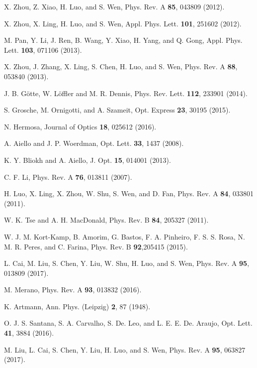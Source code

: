 \documentclass[twocolumn,showpacs,preprintnumbers,amsmath,amssymb]{revtex4}
\begin{document}
\begin{references}
 X. Zhou, Z. Xiao, H. Luo, and S. Wen, Phys. Rev. A \textbf{85}, 043809 (2012).

 X. Zhou, X. Ling, H. Luo, and S. Wen, Appl. Phys. Lett. \textbf{101}, 251602 (2012).

 M. Pan, Y. Li, J. Ren, B. Wang, Y. Xiao, H. Yang, and Q. Gong, Appl. Phys. Lett. \textbf{103}, 071106 (2013).

 X. Zhou, J. Zhang, X. Ling, S. Chen, H. Luo, and S. Wen, Phys. Rev. A \textbf{88}, 053840 (2013).

 J. B. G\"{o}tte, W. L\"{o}ffler and M. R. Dennis, Phys. Rev. Lett. \textbf{112}, 233901 (2014).

 S. Grosche, M. Ornigotti, and A. Szameit, Opt. Express \textbf{23}, 30195 (2015).

 N. Hermosa, Journal of Optics \textbf{18}, 025612 (2016).

 A. Aiello and J. P. Woerdman, Opt. Lett. \textbf{33}, 1437 (2008).

 K. Y. Bliokh and A. Aiello, J. Opt. \textbf{15}, 014001 (2013).

 C. F. Li, Phys. Rev. A \textbf{76}, 013811 (2007).

 H. Luo, X. Ling, X. Zhou, W. Shu, S. Wen, and D. Fan, Phys. Rev. A \textbf{84}, 033801 (2011).

 W. K. Tse and A. H. MacDonald, Phys. Rev. B \textbf{84}, 205327 (2011).

 W. J. M. Kort-Kamp, B. Amorim, G. Bastos, F. A. Pinheiro, F. S. S. Rosa, N. M. R. Peres, and C. Farina, Phys. Rev. B \textbf{92},205415 (2015).

 L. Cai, M. Liu, S. Chen, Y. Liu, W. Shu, H. Luo, and S. Wen, Phys. Rev. A \textbf{95}, 013809 (2017).

 M. Merano, Phys. Rev. A \textbf{93}, 013832 (2016).

 K. Artmann, Ann. Phys. (Leipzig) \textbf{2}, 87 (1948).

 O. J. S. Santana, S. A. Carvalho, S. De. Leo, and L. E. E. De. Araujo, Opt. Lett. \textbf{41}, 3884 (2016).

 M. Liu, L. Cai, S. Chen, Y. Liu, H. Luo, and S. Wen, Phys. Rev. A \textbf{95}, 063827 (2017).

\end{references}
\end{document}
